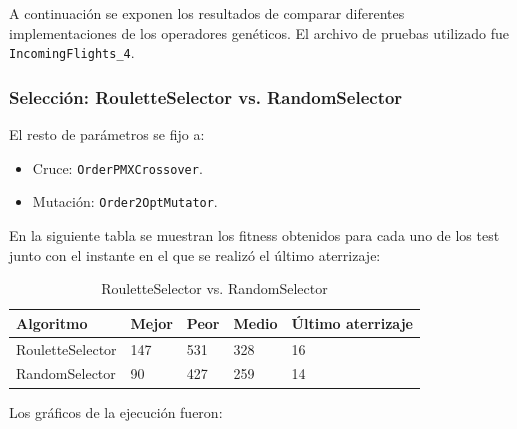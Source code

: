\documentclass[a4paper,12pt,titlepage]{article}
\begin{document}
A continuación se exponen los resultados de comparar diferentes implementaciones de los operadores genéticos. El archivo de pruebas utilizado fue \lstinline|IncomingFlights_4|.

\subsubsection{Selección: RouletteSelector vs. RandomSelector}

El resto de parámetros se fijo a:

\begin{itemize}[noitemsep]
	\item Cruce: \lstinline|OrderPMXCrossover|.
	\item Mutación: \lstinline|Order2OptMutator|.	
\end{itemize}

En la siguiente tabla se muestran los fitness obtenidos para cada uno de los test junto con el instante en el que se realizó el último aterrizaje:

\begin{table}[!ht]
\centering
\begin{tabular}{@{}lllll@{}}
\toprule
Algoritmo        & Mejor & Peor & Medio & Último aterrizaje \\ \midrule
RouletteSelector & 147   & 531  & 328   & 16                \\
RandomSelector   & 90    & 427  & 259   & 14                \\ \bottomrule
\end{tabular}
\caption{RouletteSelector vs. RandomSelector}
\end{table}

Los gráficos de la ejecución fueron:
\newpage
\end{document}
